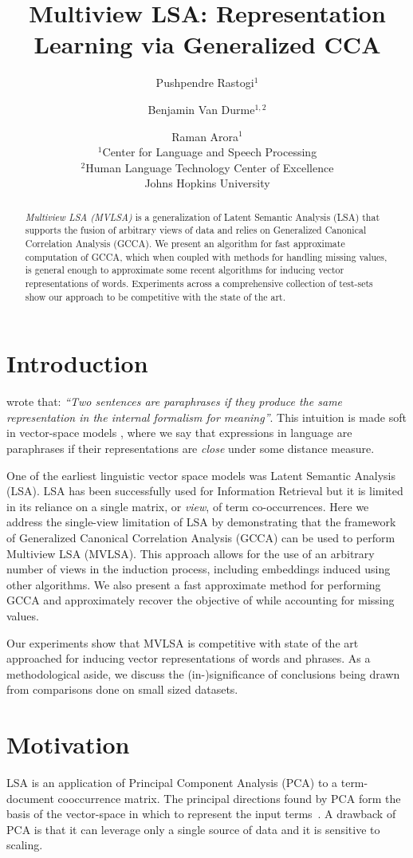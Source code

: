 \documentclass[11pt]{article}
\title{Multiview LSA: Representation Learning via Generalized CCA}
\author{Pushpendre Rastogi$^1$ \and Benjamin Van Durme$^{1,2}$ \and Raman Arora$^{1}$\\
  $^1$Center for Language and Speech Processing\\
    $^2$Human Language Technology Center of Excellence\\
    Johns Hopkins University}
\date{}
\begin{document}
\maketitle
\begin{abstract}
  \emph{Multiview LSA (MVLSA)} is a generalization of Latent Semantic
  Analysis (LSA) that supports the
  fusion of arbitrary views of data and relies on Generalized Canonical Correlation
  Analysis (GCCA). We present an algorithm
  for fast approximate computation of GCCA, which when coupled with methods
  for handling missing values, is general enough to approximate
  some recent algorithms for inducing vector representations of
  words. Experiments across a comprehensive
  collection of test-sets show our approach to be competitive with the
  state of the art.
\end{abstract}

\section{Introduction}
 wrote that: \emph{``Two sentences
  are paraphrases if they produce the same representation in the
  internal formalism for meaning''}.  This intuition is made soft in
vector-space models \cite{turney2010frequency}, where we say that
expressions in language are paraphrases if
their representations are \emph{close} under some distance measure.

One of the earliest linguistic vector space models was Latent
Semantic Analysis (LSA). LSA has been successfully used
for Information Retrieval but it is limited in its
reliance on a single matrix, or \emph{view}, of term co-occurrences.
Here we address the single-view limitation of LSA by demonstrating
that the framework of Generalized Canonical Correlation Analysis
(GCCA) can be used to perform Multiview LSA (MVLSA). This
approach allows for the use of an arbitrary number of views in the
induction process, including embeddings induced using other
algorithms. We also present a fast approximate method for performing
GCCA and approximately recover the objective of
\cite{pennington2014glove} while accounting for missing values.

Our experiments show that MVLSA is competitive with state of the art
approached for inducing vector representations of words and phrases.
As a methodological aside, we discuss the \mbox{(in-)significance} of
conclusions being drawn from comparisons done on small sized datasets.

\section{Motivation}
LSA is an application of Principal Component Analysis (PCA) to a
term-document cooccurrence matrix.  The principal directions found by
PCA form the basis of the vector-space in which to represent the input
terms~\cite{landauer1997solution}. A drawback of PCA is that it can
leverage only a single source of data and it is sensitive to scaling.
\end{document}
